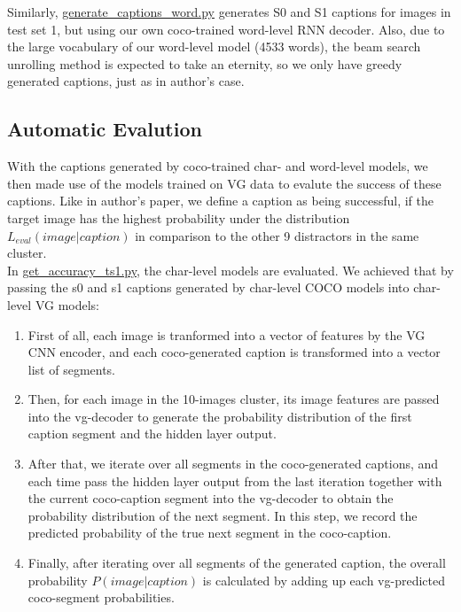 \documentclass[a4paper]{scrartcl}
\begin{document}
Similarly, \href{https://github.com/Meng3www/PPlusPlus/blob/main/evaluate/generate\_captions\_word.py}{generate\_captions\_word.py} generates S0 and S1 captions for images in test set 1, but using our own coco-trained word-level RNN decoder. Also, due to the large vocabulary of our word-level model (4533 words), the beam search unrolling method is expected to take an eternity, so we only have greedy generated captions, just as in author's case.\\

\subsection*{Automatic Evalution}
With the captions generated by coco-trained char- and word-level models, we then made use of the models trained on VG data to evalute the success of these captions. Like in author's paper, we define a caption as being successful, if the target image has the highest probability under the distribution $L_{eval}(image|caption)$ in comparison to the other 9 distractors in the same cluster. \\

In \href{https://github.com/Meng3www/PPlusPlus/blob/main/evaluate/get\_accuracy\_ts1.py}{get\_accuracy\_ts1.py}, the char-level models are evaluated. We achieved that by passing the s0 and s1 captions generated by char-level COCO models into char-level VG models: \\
\begin{enumerate}
\item First of all, each image is tranformed into a vector of features by the VG CNN encoder, and each coco-generated caption is transformed into a vector list of segments.
\item Then, for each image in the 10-images cluster, its image features are passed into the vg-decoder to generate the probability distribution of the first caption segment and the hidden layer output. 
\item After that, we iterate over all segments in the coco-generated captions, and each time pass the hidden layer output from the last iteration together with the current coco-caption segment into the vg-decoder to obtain the probability distribution of the next segment. In this step, we record the predicted probability of the true next segment in the coco-caption. 
\item Finally, after iterating over all segments of the generated caption, the overall probability $P(image|caption)$ is calculated by adding up each vg-predicted coco-segment probabilities.\\
\end{enumerate}
\end{document}
